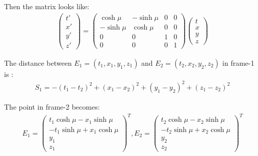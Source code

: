 \documentclass[]{ctexart}
\begin{document}
			Then the matrix looks like:
				\begin{equation*}
				\begin{aligned}
					\begin{pmatrix}
						t'\\
						x'\\
						y'\\
						z'
					\end{pmatrix}
					=
					\begin{pmatrix}
						\cosh \mu & -\sinh \mu & 0 & 0\\
						-\sinh \mu & \cosh \mu & 0 & 0\\
						0 & 0 & 1 & 0\\
						0 & 0 & 0 & 1
					\end{pmatrix}
					\begin{pmatrix}
						t\\
						x\\
						y\\
						z
					\end{pmatrix}
				\end{aligned}
				\end{equation*}
			
			The distance between $ E_1=(t_1,x_1,y_1,z_1) $ and $ E_2= (t_2,x_2,y_2,z_2) $ in frame-1 is :
				\begin{equation*}
				\begin{aligned}
					S_1=-(t_1-t_2)^2+(x_1-x_2)^2+(y_1-y_2)^2+(z_1-z_2)^2
				\end{aligned}
				\end{equation*}
			
			The point in frame-2 becomes: 
				\begin{equation*}
				\begin{aligned}
					E_1=
					\begin{pmatrix}
					t_1\cosh \mu -x_1\sinh\mu \\
					-t_1\sinh \mu +x_1\cosh\mu\\
					y_1\\
					z_1
					\end{pmatrix}^T,
					E_2=
					\begin{pmatrix}
					t_2\cosh \mu -x_2\sinh\mu \\
					-t_2\sinh \mu +x_2\cosh\mu\\
					y_2\\
					z_2
					\end{pmatrix}^T
				\end{aligned}
				\end{equation*}
			
\end{document}
